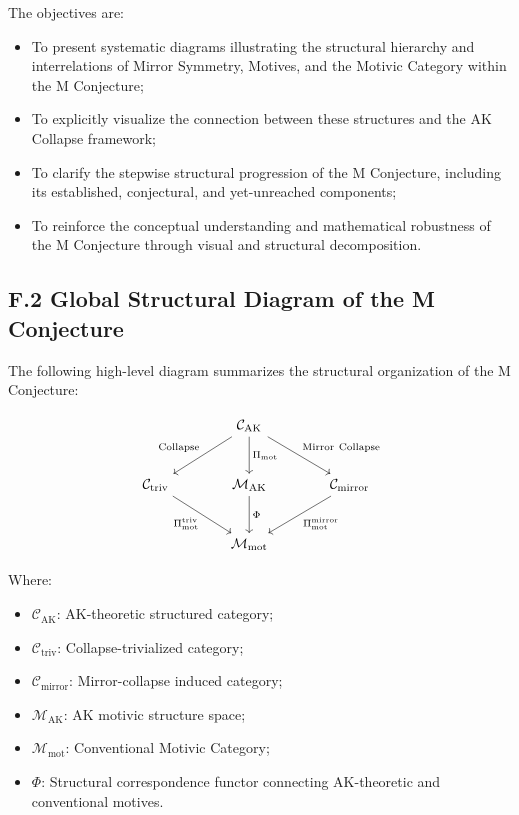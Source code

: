 \documentclass[11pt]{article}
\begin{document}
The objectives are:

\begin{itemize}
    \item To present systematic diagrams illustrating the structural hierarchy and interrelations of Mirror Symmetry, Motives, and the Motivic Category within the M Conjecture;
    \item To explicitly visualize the connection between these structures and the AK Collapse framework;
    \item To clarify the stepwise structural progression of the M Conjecture, including its established, conjectural, and yet-unreached components;
    \item To reinforce the conceptual understanding and mathematical robustness of the M Conjecture through visual and structural decomposition.
\end{itemize}

\subsection*{F.2 Global Structural Diagram of the M Conjecture}

The following high-level diagram summarizes the structural organization of the M Conjecture:

\[
\begin{tikzcd}[column sep=large, row sep=large]
& \mathcal{C}_{\mathrm{AK}} \arrow[dl, "\mathrm{Collapse}"'] \arrow[d, "\Pi_{\mathrm{mot}}"] \arrow[dr, "\mathrm{Mirror\ Collapse}"] \\
\mathcal{C}_{\mathrm{triv}} \arrow[dr, "\Pi_{\mathrm{mot}}^{\mathrm{triv}}"'] 
& \mathcal{M}_{\mathrm{AK}} \arrow[d, "\Phi"] 
& \mathcal{C}_{\mathrm{mirror}} \arrow[dl, "\Pi_{\mathrm{mot}}^{\mathrm{mirror}}"] \\
& \mathcal{M}_{\mathrm{mot}} 
\end{tikzcd}
\]

Where:

\begin{itemize}
    \item $\mathcal{C}_{\mathrm{AK}}$: AK-theoretic structured category;
    \item $\mathcal{C}_{\mathrm{triv}}$: Collapse-trivialized category;
    \item $\mathcal{C}_{\mathrm{mirror}}$: Mirror-collapse induced category;
    \item $\mathcal{M}_{\mathrm{AK}}$: AK motivic structure space;
    \item $\mathcal{M}_{\mathrm{mot}}$: Conventional Motivic Category;
    \item $\Phi$: Structural correspondence functor connecting AK-theoretic and conventional motives.
\end{itemize}
\end{document}
